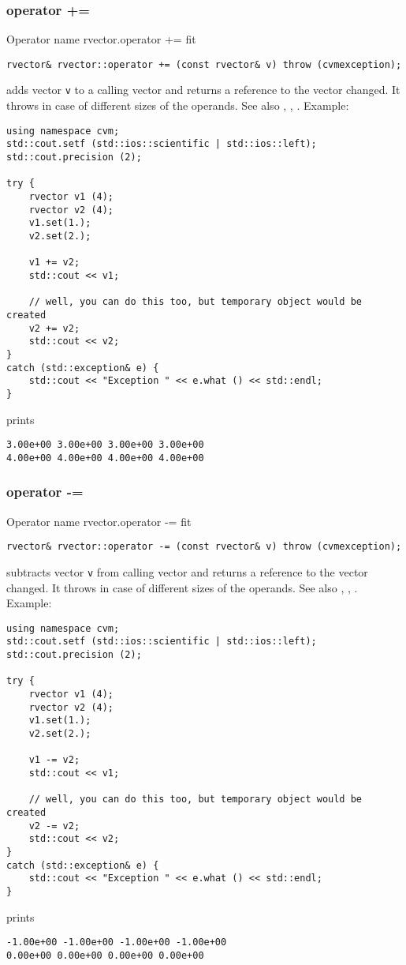 \subsubsection{operator +=}
Operator%
\pdfdest name {rvector.operator +=} fit
\begin{verbatim}
rvector& rvector::operator += (const rvector& v) throw (cvmexception);
\end{verbatim}
adds vector \verb"v" to a calling vector 
and returns a reference to
the vector changed.
It throws  
in case of different sizes of the operands.
See also ,
,
.
Example:
\begin{Verbatim}
using namespace cvm;
std::cout.setf (std::ios::scientific | std::ios::left); 
std::cout.precision (2);

try {
    rvector v1 (4);
    rvector v2 (4);
    v1.set(1.);
    v2.set(2.);

    v1 += v2;
    std::cout << v1;

    // well, you can do this too, but temporary object would be created
    v2 += v2; 
    std::cout << v2;
}
catch (std::exception& e) {
    std::cout << "Exception " << e.what () << std::endl;
}
\end{Verbatim}
prints
\begin{Verbatim}
3.00e+00 3.00e+00 3.00e+00 3.00e+00
4.00e+00 4.00e+00 4.00e+00 4.00e+00
\end{Verbatim}
\newpage


\subsubsection{operator -=}
Operator%
\pdfdest name {rvector.operator -=} fit
\begin{verbatim}
rvector& rvector::operator -= (const rvector& v) throw (cvmexception);
\end{verbatim}
subtracts vector \verb"v" from calling vector 
and returns a reference to
the vector changed.
It throws  
in case of different sizes of the operands.
See also ,
,
.
Example:
\begin{Verbatim}
using namespace cvm;
std::cout.setf (std::ios::scientific | std::ios::left); 
std::cout.precision (2);

try {
    rvector v1 (4);
    rvector v2 (4);
    v1.set(1.);
    v2.set(2.);

    v1 -= v2;
    std::cout << v1;

    // well, you can do this too, but temporary object would be created
    v2 -= v2; 
    std::cout << v2;
}
catch (std::exception& e) {
    std::cout << "Exception " << e.what () << std::endl;
}
\end{Verbatim}
prints
\begin{Verbatim}
-1.00e+00 -1.00e+00 -1.00e+00 -1.00e+00
0.00e+00 0.00e+00 0.00e+00 0.00e+00
\end{Verbatim}
\newpage


